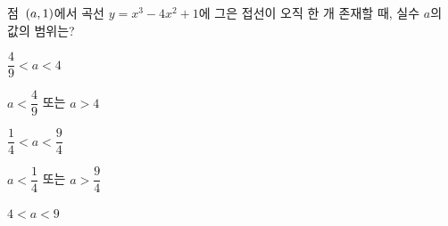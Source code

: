 점~$(a{,}\mkern3mu\mathopen{}1)$에서 곡선 $y=x^3-4x^2+1$에 그은 접선이 오직 한 개 존재할 때, 실수 $a$의 값의 범위는?
\begin{choicesii}{\rule[-3ex]{0pt}{8ex}$\dfrac{4}{9}<a<4$}{\rule[-3ex]{0pt}{8ex}$a<\dfrac{4}{9}$ 또는 $a>4$}{\rule[-3ex]{0pt}{8ex}$\dfrac{1}{4}<a<\dfrac{9}{4}$}{\rule[-3ex]{0pt}{8ex}$a<\dfrac{1}{4}$ 또는 $a>\dfrac{9}{4}$}{\rule[-3ex]{0pt}{8ex}$4<a<9$}\end{choicesii}
